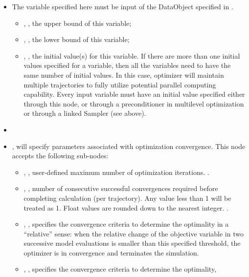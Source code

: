 \begin{itemize}
\item \variableDescription
 The variable specified here must be input of the DataObject specified in .
 \variableChildrenIntro
 \begin{itemize}
    \item {}, , the upper bound of this variable;
    \item {}, , the lower bound of this variable;
    \item {}, , the initial value(s) for this variable. If there are more
    than one initial values specified for a variable, then all the variables need to have the same number of initial values. In this case,
     optimizer will maintain multiple trajectories to fully utilize potential parallel computing capability.
    Every input variable must have an initial value specified either through this node, or through a
    preconditioner in multilevel optimization or through a linked Sampler (see above).
  \end{itemize}
\item \constantVariablesDescription
\item {},  will specify parameters associated with optimization
convergence. This node accepts the following sub-nodes:
  \begin{itemize}
  \item {}, , user-defined maximum number of optimization iterations. .
  \item {}, , number of consecutive successful
    convergences required before completing calculation (per trajectory). Any value less than 1 will be
    treated as 1.  Float values are rounded down to the nearest integer. .
  \item {}, , specifies the convergence criteria to determine the optimality
  in a ``relative'' sense: when the relative change of the objective variable in two successive model evaluations is smaller than
  this specified threshold, the  optimizer is in convergence and terminates the simulation.
  \item {}, , specifies the convergence criteria to determine the optimality,

\end{itemize}
\end{itemize}
